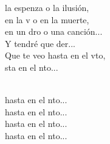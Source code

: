 \documentclass[12pt]{article}
\begin{document}
\begin{multicols*}{2}
\begin{cancion}
\begin{chorus}
	la espenza o la ilusión,\\
	en la v o en la muerte, \\
	en un dro o una canción...\\
	Y tendré que der...\\
	Que te veo hasta en el vto, \\
	sta en el nto...\\
	\end{chorus}%
	\jump\\
	hasta en el nto...\\
	hasta en el nto...\\
	hasta en el nto...\\
	hasta en el nto...  \\
\end{cancion}%


\end{multicols*}
\end{document}
